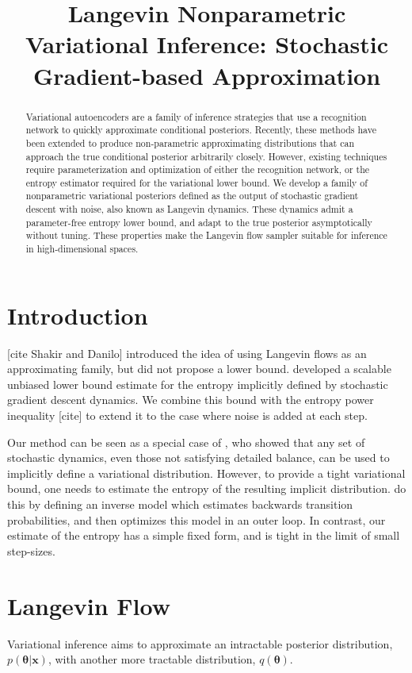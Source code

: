 \documentclass{article}
\title{Langevin Nonparametric Variational Inference: Stochastic Gradient-based Approximation}
\author{}
\newcommand{\vx}{\mathbf{x}}
\newcommand{\data}{\vx}
\newcommand{\params}{\mathbf{\theta}}
\newcommand{\posterior}{p(\params | \data)}
\begin{document}
\maketitle

\begin{abstract}
Variational autoencoders are a family of inference strategies that use a recognition network to quickly approximate conditional posteriors.
Recently, these methods have been extended to produce non-parametric approximating distributions that can approach the true conditional posterior arbitrarily closely.
However, existing techniques require parameterization and optimization of either the recognition network, or the entropy estimator required for the variational lower bound.
We develop a family of nonparametric variational posteriors defined as the output of stochastic gradient descent with noise, also known as Langevin dynamics.
These dynamics admit a parameter-free entropy lower bound, and adapt to the true posterior asymptotically without tuning.
These properties make the Langevin flow sampler suitable for inference in high-dimensional spaces.
\end{abstract}

\section{Introduction}

[cite Shakir and Danilo] introduced the idea of using Langevin flows as an approximating family, but did not propose a lower bound.
\citet{MacDuvAda2015hyper} developed a scalable unbiased lower bound estimate for the entropy implicitly defined by stochastic gradient descent dynamics.
We combine this bound with the entropy power inequality [cite] to extend it to the case where noise is added at each step.

Our method can be seen as a special case of \citet{Bridging14}, who showed that any set of stochastic dynamics, even those not satisfying detailed balance, can be used to implicitly define a variational distribution.
However, to provide a tight variational bound, one needs to estimate the entropy of the resulting implicit distribution.
\citet{Bridging14} do this by defining an inverse model which estimates backwards transition probabilities, and then optimizes this model in an outer loop.
In contrast, our estimate of the entropy has a simple fixed form, and is tight in the limit of small step-sizes.


\section{Langevin Flow}
\label{sec:techintro}
Variational inference \citep{wainwright2008graphical} aims to approximate an intractable posterior distribution, $\posterior$, with another more tractable distribution, $q(\params)$.
\end{document}
